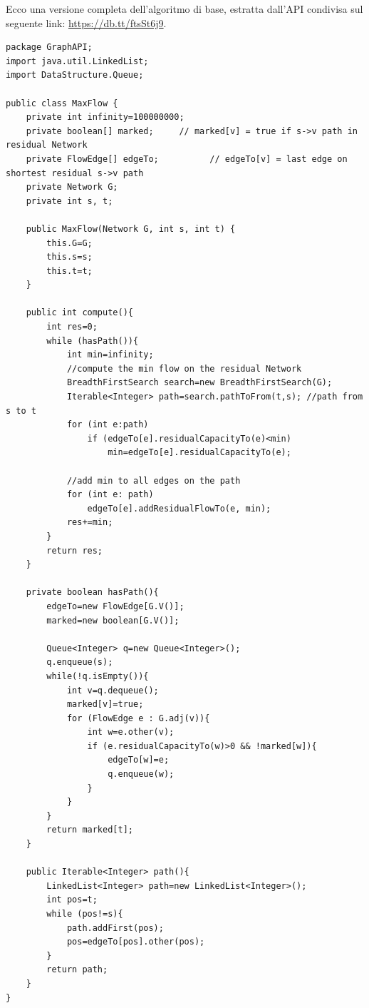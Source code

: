 \documentclass[a4paper]{book}
\newcommand{\lstIndent}{4}
\begin{document}
Ecco una versione completa dell'algoritmo di base, estratta dall'API condivisa sul seguente link: \url{https://db.tt/ftsSt6j9}.
\begin{lstlisting}[tabsize=\lstIndent]
package GraphAPI;
import java.util.LinkedList;
import DataStructure.Queue;

public class MaxFlow {
	private int infinity=100000000;
    private boolean[] marked;     // marked[v] = true if s->v path in residual Network
    private FlowEdge[] edgeTo;    		// edgeTo[v] = last edge on shortest residual s->v path
    private Network G;
    private int s, t;

    public MaxFlow(Network G, int s, int t) {
    	this.G=G;
    	this.s=s;
    	this.t=t;
    }

    public int compute(){
    	int res=0;
    	while (hasPath()){
    		int min=infinity;
    		//compute the min flow on the residual Network
    		BreadthFirstSearch search=new BreadthFirstSearch(G);
    		Iterable<Integer> path=search.pathToFrom(t,s); //path from s to t
    		for (int e:path)
    			if (edgeTo[e].residualCapacityTo(e)<min)
    				min=edgeTo[e].residualCapacityTo(e);
    		
    		//add min to all edges on the path
    		for (int e: path)
    			edgeTo[e].addResidualFlowTo(e, min);
    		res+=min;
    	}
    	return res;
    }
  
    private boolean hasPath(){
    	edgeTo=new FlowEdge[G.V()];
    	marked=new boolean[G.V()];
    	
    	Queue<Integer> q=new Queue<Integer>();
    	q.enqueue(s);
    	while(!q.isEmpty()){
    		int v=q.dequeue();
    		marked[v]=true;
    		for (FlowEdge e : G.adj(v)){
    			int w=e.other(v);
    			if (e.residualCapacityTo(w)>0 && !marked[w]){
    				edgeTo[w]=e;
    				q.enqueue(w);
    			}
    		}
    	}
    	return marked[t];
    }
    
    public Iterable<Integer> path(){
    	LinkedList<Integer> path=new LinkedList<Integer>();
    	int pos=t;
    	while (pos!=s){
    		path.addFirst(pos);
    		pos=edgeTo[pos].other(pos);
     	}
    	return path;
    }
}
\end{lstlisting} 
\end{document}
